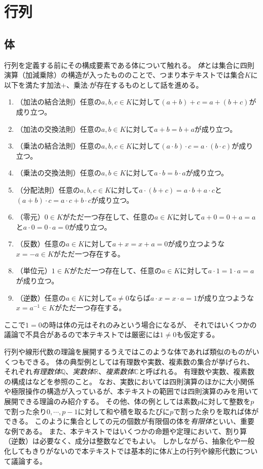 
\chapter{行列}

\section{体}

行列を定義する前にその構成要素である体について触れる。
\emph{体}とは集合に四則演算（加減乗除）の構造が入ったもののことで、つまり本テキストでは集合$K$に以下を満たす加法$+$、乗法$\cdot$が存在するものとして話を進める。

\begin{enumerate}
\item
（加法の結合法則）任意の$a, b, c \in K$に対して$(a+b)+c = a+(b+c)$が成り立つ。
\item
（加法の交換法則）任意の$a, b \in K$に対して$a+b = b+a$が成り立つ。
\item
（乗法の結合法則）任意の$a, b, c \in K$に対して$(a\cdot b)\cdot c = a\cdot (b\cdot c)$が成り立つ。
\item
（乗法の交換法則）任意の$a, b \in K$に対して$a\cdot b = b\cdot a$が成り立つ。
\item
（分配法則）任意の$a, b, c \in K$に対して$a\cdot (b+c) = a\cdot b+a\cdot c$と$(a+b)\cdot c = a\cdot c+b\cdot c$が成り立つ。
\item
（零元）$0 \in K$がただ一つ存在して、任意の$a \in K$に対して$a+0 = 0+a = a$と$a\cdot 0 = 0\cdot a = 0$が成り立つ。
\item
（反数）任意の$a \in K$に対して$a+x = x+a = 0$が成り立つような$x = -a \in K$がただ一つ存在する。
\item
（単位元）$1 \in K$がただ一つ存在して、任意の$a \in K$に対して$a\cdot 1 = 1\cdot a = a$が成り立つ。
\item
（逆数）任意の$a \in K$に対して$a \ne 0$ならば$a\cdot x = x\cdot a = 1$が成り立つような$x = a^{-1} \in K$がただ一つ存在する。
\end{enumerate}

ここで$1 = 0$の時は体の元はそれのみという場合になるが、
それではいくつかの議論で不具合があるので本テキストでは厳密には$1 \ne 0$も仮定する。

行列や線形代数の理論を展開するうえではこのような体であれば類似のものがいくつもできる。
体の典型例としては有理数や実数、複素数の集合が挙げられ、それぞれ\emph{有理数体}$\mathbb{Q}$、\emph{実数体}$\mathbb{R}$、\emph{複素数体}$\mathbb{C}$と呼ばれる。
有理数や実数、複素数の構成は\cite{N}などを参照のこと。
なお、実数においては四則演算のほかに大小関係や極限操作の構造が入っているが、本テキストの範囲では四則演算のみを用いて展開できる理論のみ紹介する。
その他、体の例としては素数$p$に対して整数を$p$で割った余り$0, \cdots, p-1$に対して和や積を取るたびに$p$で割った余りを取れば体ができる。
このように集合としての元の個数が有限個の体を\emph{有限体}といい、重要な例である。
また、本テキストではいくつかの命題や定理において、割り算（逆数）は必要なく、成分は整数などでもよい。
しかしながら、抽象化や一般化してもきりがないので本テキストでは基本的に体$K$上の行列や線形代数について議論する。

